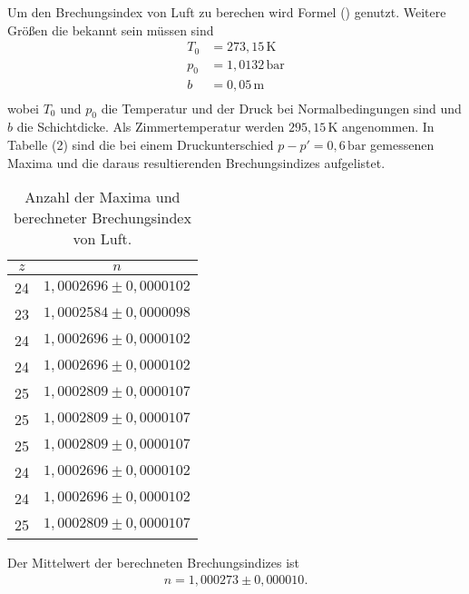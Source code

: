 Um den Brechungsindex von Luft zu berechen wird Formel () genutzt. Weitere Größen die bekannt sein müssen sind
\begin{align*}
T_0 &= 273,15 \,\si{\kelvin}\\
p_0 &= 1,0132 \,\si{\bar}\\
b &= 0,05 \,\si{\meter}\\
\end{align*}
wobei $T_0$ und $p_0$ die Temperatur und der Druck bei Normalbedingungen sind und $b$ die Schichtdicke.
Als Zimmertemperatur werden $295,15 \,\si{\kelvin}$ angenommen.
In Tabelle (2) sind die bei einem Druckunterschied $p-p'= 0,6 \,\si{\bar}$ gemessenen Maxima und die daraus resultierenden Brechungsindizes aufgelistet.
\begin{table}[H]
\centering
\caption{Anzahl der Maxima und berechneter Brechungsindex von Luft.}
\label{tab:einzel1}
\begin{tabular}{c c}
\toprule
$z$ & $n$\\
\midrule
24 & $1,0002696 \pm 0,0000102$ \\
23 & $1,0002584 \pm 0,0000098$ \\
24 & $1,0002696 \pm 0,0000102$ \\
24 & $1,0002696 \pm 0,0000102$ \\
25 & $1,0002809 \pm 0,0000107$ \\
25 & $1,0002809 \pm 0,0000107$ \\
25 & $1,0002809 \pm 0,0000107$ \\
24 & $1,0002696 \pm 0,0000102$ \\
24 & $1,0002696 \pm 0,0000102$ \\
25 & $1,0002809 \pm 0,0000107$ \\
\bottomrule
\end{tabular}
\end{table}
Der Mittelwert der berechneten Brechungsindizes ist
\begin{align*}
n = 1,000273 \pm 0,000010 .
\end{align*}

